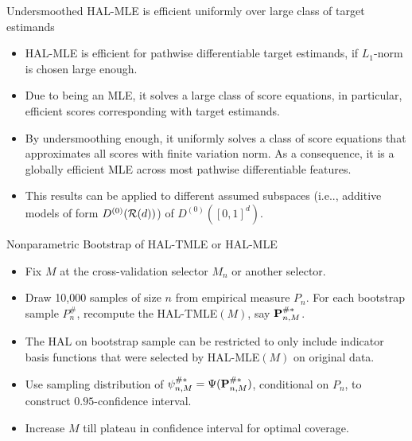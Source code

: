 \documentclass[t]{beamer}
\begin{document}
\begin{frame}{Undersmoothed HAL-MLE   is efficient uniformly over large class of target estimands}
\begin{itemize}
\item HAL-MLE is efficient for pathwise differentiable target estimands, if $L_1$-norm is chosen large enough.
\item Due to being an MLE, it solves a large class of score equations, in particular, efficient scores corresponding with target estimands.
\item By undersmoothing enough, it uniformly solves a class of score equations that approximates all scores with finite variation norm. As a consequence, it is a globally efficient MLE across most pathwise differentiable features.
\item This results can be applied to different assumed subspaces (i.e.., additive models of form $D^{(0)}({\cal R}(d))$) of $D^{(0)}([0,1]^d)$.
\end{itemize}
\end{frame}

\begin{frame}{Nonparametric  Bootstrap of HAL-TMLE or HAL-MLE}
\begin{itemize}
\item Fix $M$ at the cross-validation selector $M_n$ or another selector.
\item Draw 10,000 samples of size $n$ from empirical measure $P_n$.
For each bootstrap sample $P_n^{\#}$, recompute the HAL-TMLE$(M)$, say ${\bf P}_{n,M}^{\#*}$.
\item The HAL on bootstrap sample can be restricted to only include indicator basis functions that were selected by HAL-MLE$(M)$ on original data.
\item Use sampling distribution of $\psi_{n,M}^{\#*}=\Psi({\bf P}_{n,M}^{\#*})$, conditional on $P_n$, to construct $0.95$-confidence interval.
\item Increase $M$ till plateau in confidence interval for optimal coverage.
\end{itemize}
\end{frame}
\end{document}
